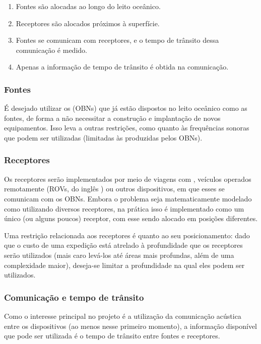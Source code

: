 \begin{enumerate}[itemsep=0pt]
	\item Fontes são alocadas ao longo do leito oceânico.
	\item Receptores são alocados próximos à superfície.
	\item Fontes se comunicam com receptores, e o tempo de trânsito dessa comunicação é medido.
	\item Apenas a informação de tempo de trânsito é obtida na comunicação.
\end{enumerate}

\subsubsection*{Fontes}

É desejado utilizar os  (OBNs) que já estão dispostos no leito oceânico como as fontes, de forma a não necessitar a construção e implantação de novos equipamentos. Isso leva a outras restrições, como quanto às frequências sonoras que podem ser utilizadas (limitadas às produzidas pelos OBNs).

\subsubsection*{Receptores}

Os receptores serão implementados por meio de viagens com , veículos operados remotamente (ROVs, do inglês ) ou outros dispositivos, em que esses se comunicam com os OBNs. Embora o problema seja matematicamente modelado como utilizando diversos receptores, na prática isso é implementado como um único (ou alguns poucos) receptor, com esse sendo alocado em posições diferentes.

Uma restrição relacionada aos receptores é quanto ao seu posicionamento: dado que o custo de uma expedição está atrelado à profundidade que os receptores serão utilizados (mais caro levá-los até áreas mais profundas, além de uma complexidade maior), deseja-se limitar a profundidade na qual eles podem ser utilizados.

\subsubsection*{Comunicação e tempo de trânsito}

Como o interesse principal no projeto é a utilização da comunicação acústica entre os dispositivos (ao menos nesse primeiro momento), a informação disponível que pode ser utilizada é o tempo de trânsito entre fontes e receptores.

